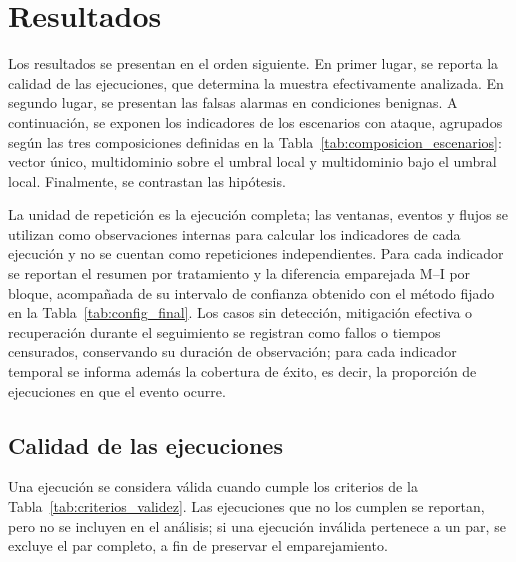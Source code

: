 \section{Resultados}
\label{sec:resultados}

Los resultados se presentan en el orden siguiente. En primer lugar, se reporta la calidad de las ejecuciones, que determina la muestra efectivamente analizada. En segundo lugar, se presentan las falsas alarmas en condiciones benignas. A continuación, se exponen los indicadores de los escenarios con ataque, agrupados según las tres composiciones definidas en la Tabla~\ref{tab:composicion_escenarios}: vector único, multidominio sobre el umbral local y multidominio bajo el umbral local. Finalmente, se contrastan las hipótesis.

La unidad de repetición es la ejecución completa; las ventanas, eventos y flujos se utilizan como observaciones internas para calcular los indicadores de cada ejecución y no se cuentan como repeticiones independientes. Para cada indicador se reportan el resumen por tratamiento y la diferencia emparejada M--I por bloque, acompañada de su intervalo de confianza obtenido con el método fijado en la Tabla~\ref{tab:config_final}. Los casos sin detección, mitigación efectiva o recuperación durante el seguimiento se registran como fallos o tiempos censurados, conservando su duración de observación; para cada indicador temporal se informa además la cobertura de éxito, es decir, la proporción de ejecuciones en que el evento ocurre.

\subsection{Calidad de las ejecuciones}
\label{subsec:calidad}

Una ejecución se considera válida cuando cumple los criterios de la Tabla~\ref{tab:criterios_validez}. Las ejecuciones que no los cumplen se reportan, pero no se incluyen en el análisis; si una ejecución inválida pertenece a un par, se excluye el par completo, a fin de preservar el emparejamiento.


